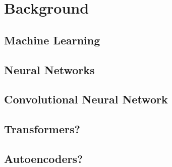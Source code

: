 \chapter{Background}
\section{Machine Learning}
\section{Neural Networks}
\section{Convolutional Neural Network}
\section{Transformers?}
\section{Autoencoders?} 